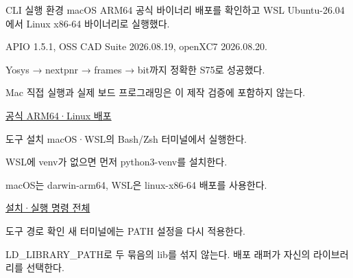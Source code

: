 \begin{frame}[label=integrated-cli-vivado]{CLI 실행 환경}\relax
\small
macOS ARM64 공식 바이너리 배포를 확인하고 WSL Ubuntu-26.04에서 Linux x86-64 바이너리로 실행했다.\par\vspace{0.22cm}APIO 1.5.1, OSS CAD Suite 2026.08.19, openXC7 2026.08.20.\par\vspace{0.22cm}Yosys → nextpnr → frames → bit까지 정확한 S75로 성공했다.\par\vspace{0.22cm}Mac 직접 실행과 실제 보드 프로그래밍은 이 제작 검증에 포함하지 않는다.\par\href{https://github.com/FPGAwars/tools-openxc7/releases/tag/2026-08-20}{공식 ARM64·Linux 배포}
\end{frame}

\begin{frame}{도구 설치}\relax
\small
macOS·WSL의 Bash/Zsh 터미널에서 실행한다.\par{}
WSL에 venv가 없으면 먼저 python3-venv를 설치한다.\par\vspace{0.22cm}macOS는 darwin-arm64, WSL은 linux-x86-64 배포를 사용한다.\par\href{https://github.com/Glaysia/ece2_26_2_2/blob/daily/0910/example/fpga_projects_hdl/LAB1/docs/cli.md}{설치·실행 명령 전체}
\end{frame}

\begin{frame}{도구 경로 확인}\relax
\small
{}
새 터미널에는 PATH 설정을 다시 적용한다.\par\vspace{0.22cm}LD\_LIBRARY\_PATH로 두 묶음의 lib를 섞지 않는다. 배포 래퍼가 자신의 라이브러리를 선택한다.\par
\end{frame}

